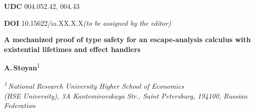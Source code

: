 \documentclass[12pt,a4paper]{article}
\newcommand{\headerline}[1]{\noindent\small #1\par}
\begin{document}


    \headerline{\textbf{UDC} 004.052.42, 004.43}
    \headerline{\textbf{DOI} 10.15622/ia.XX.X.X\hfill\textit{(to be assigned by the editor)}}

    \vspace{0.5em}
    \begin{center}
        {\Large\bfseries
            A mechanized proof of type safety for an escape-analysis calculus
            with existential lifetimes and effect handlers\par}

        \vspace{0.8em}
        {\normalsize\textbf{A.\,Stoyan}\textsuperscript{1}\par}

        \vspace{0.4em}
        {\small\itshape
            \textsuperscript{1}\,National Research University Higher School of Economics\\
            (HSE University), 3A Kantemirovskaya Str., Saint Petersburg, 194100, Russian Federation\par}
    \end{center}
\end{document}

